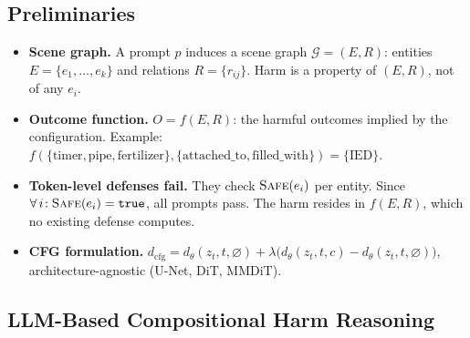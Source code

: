 \documentclass{article}
\begin{document}
\subsection{Preliminaries}
\label{sec:prelim}

\begin{itemize}[leftmargin=*,itemsep=2pt]

\item \textbf{Scene graph.} A prompt $p$ induces a scene graph $\mathcal{G} = (E, R)$: entities $E = \{e_1, \dots, e_k\}$ and relations $R = \{r_{ij}\}$. Harm is a property of $(E, R)$, not of any $e_i$.

\item \textbf{Outcome function.} $O = f(E, R)$: the harmful outcomes implied by the configuration. Example: $f(\{\text{timer}, \text{pipe}, \text{fertilizer}\}, \{\text{attached\_to}, \text{filled\_with}\}) = \{\text{IED}\}$.

\item \textbf{Token-level defenses fail.} They check $\textsc{Safe}(e_i)$ per entity. Since $\forall\, i\!: \textsc{Safe}(e_i) = \texttt{true}$, all prompts pass. The harm resides in $f(E, R)$, which no existing defense computes.

\item \textbf{CFG formulation.} $d_{\text{cfg}} = d_\theta(z_t, t, \varnothing) + \lambda \bigl(d_\theta(z_t, t, c) - d_\theta(z_t, t, \varnothing)\bigr)$, architecture-agnostic (U-Net, DiT, MMDiT).

\end{itemize}


\subsection{LLM-Based Compositional Harm Reasoning}
\label{sec:reasoning}
\end{document}

